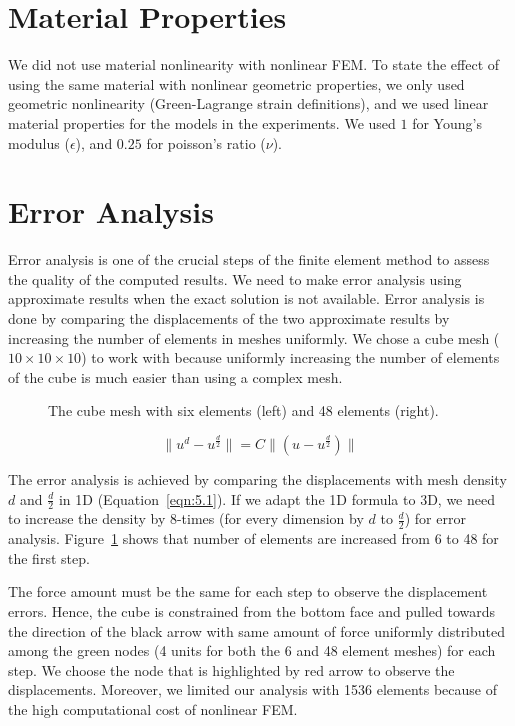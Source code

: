 \section{Material Properties}

We did not use material nonlinearity with nonlinear FEM. To state the effect of using the same material with nonlinear geometric properties, we only used geometric nonlinearity (Green-Lagrange strain definitions), and we used linear material properties for the models in the experiments. We used $1$ for Young's modulus ($\epsilon$), and $0.25$ for poisson's ratio ($\nu$).

\section{Error Analysis}

Error analysis is one of the crucial steps of the finite element method to assess the quality of the computed results. We need to make error analysis using approximate results when the exact solution is not available. Error analysis is done by comparing the displacements of the two approximate results by increasing the number of elements in meshes uniformly. We chose a cube mesh ($10 \times 10 \times 10$) to work with because uniformly increasing the number of elements of the cube is much easier than using a complex mesh.

\begin{figure}[htb]
\centerline{}
\caption{The cube mesh with six elements (left) and 48 elements (right).}
\label{fig:denser}
\end{figure}

\begin{equation}
\parallel u^d - u^{\frac{d}{2}}\parallel = C \parallel (u - u^{\frac{d}{2}}) \parallel
\label{eqn:5.1}
\end{equation}

The error analysis is achieved by comparing the displacements with mesh density $d$ and $\frac{d}{2}$ in 1D (Equation~\ref{eqn:5.1}). If we adapt the 1D formula to 3D, we need to increase the density by 8-times (for every dimension by $d$ to $\frac{d}{2}$) for error analysis. Figure~\ref{fig:denser} shows that number of elements are increased from 6 to 48 for the first step.

The force amount must be the same for each step to observe the displacement errors. Hence, the cube is constrained from the bottom face and pulled towards the direction of the black arrow with same amount of force uniformly distributed among the green nodes (4 units for both the 6 and 48 element meshes) for each step. We choose the node that is highlighted by red arrow to observe the displacements. Moreover, we limited our analysis with 1536 elements because of the high computational cost of nonlinear FEM.

